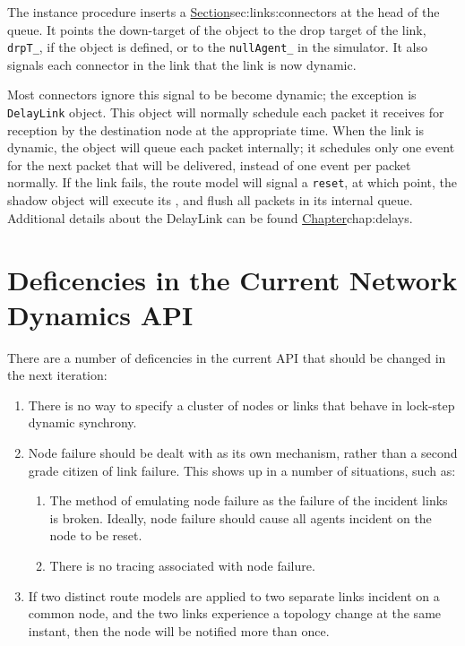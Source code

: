 The instance procedure  inserts a 
\href{DynamicLink object}{Section}{sec:links:connectors}
at the head of the queue.
It points the down-target of the object to the 
drop target of the link, {\tt drpT\_}, if the object is defined,
or to the {\tt nullAgent\_} in the simulator.
It also signals each connector in the link that the link is now
dynamic.

Most connectors ignore this signal to be become dynamic;
the exception is {\tt DelayLink} object.
This object will normally schedule each packet it receives
for reception by the destination node at the appropriate time.
When the link is dynamic, the object will queue each packet 
internally; it schedules only one event for the next packet
that will be delivered, instead of one event per packet normally.
If the link fails, the route model will signal a {\tt reset},
at which point, the shadow object will execute its
,
and flush all packets in its internal queue.
Additional details about the DelayLink can be found
\href{in another chapter}{Chapter}{chap:delays}.

\section{Deficencies in the Current Network Dynamics API}
\label{sec:deficiencies}

There are a number of deficencies in the current API that should be
changed in the next iteration:
\begin{enumerate}
\item  There is no way to specify a cluster of nodes or links that
behave in lock-step dynamic synchrony.
\item  Node failure should be dealt with as its own mechanism,
rather than a second grade citizen of link failure.
This shows up in a number of situations, such as:
\begin{enumerate}
\item  The method of emulating node failure as the failure of the
incident links is broken.  Ideally, node failure should cause all
agents incident on the node to be reset.
\item  There is no tracing associated with node failure.
\end{enumerate}
\item  If two distinct route models are applied to two separate links
incident on a common node, and the two links experience a topology change
at the same instant, then the node will be notified more than once.
\end{enumerate}



